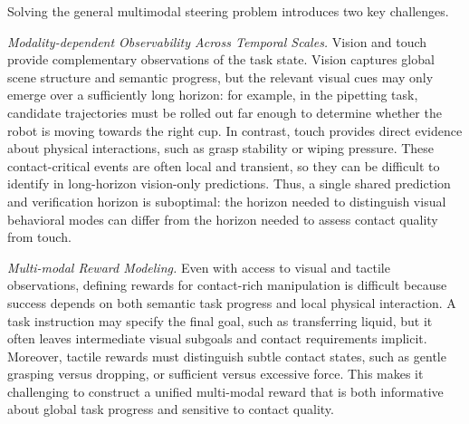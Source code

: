 \label{sec:open_challenges}Solving the general multimodal steering problem introduces two key challenges.



\textit{Modality-dependent Observability Across Temporal Scales.}
Vision and touch provide complementary observations of the task state. 
Vision captures global scene structure and semantic progress, but the relevant visual cues may only emerge over a sufficiently long horizon: for example, in the pipetting task, candidate trajectories must be rolled out far enough to determine whether the robot is moving towards the right cup. 
In contrast, touch provides direct evidence about physical interactions, such as grasp stability or wiping pressure. These contact-critical events are often local and transient, so they can be difficult to identify in long-horizon vision-only predictions. 
Thus, a single shared prediction and verification horizon is suboptimal: the horizon needed to distinguish visual behavioral modes can differ from the horizon needed to assess contact quality from touch.

\textit{Multi-modal Reward Modeling.}
Even with access to visual and tactile observations, defining rewards for contact-rich manipulation is difficult because success depends on both semantic task progress and local physical interaction. A task instruction may specify the final goal, such as transferring liquid, but it often leaves intermediate visual subgoals and contact requirements implicit. Moreover, tactile rewards must distinguish subtle contact states, such as gentle grasping versus dropping, or sufficient versus excessive force. This makes it challenging to construct a unified multi-modal reward that is both informative about global task progress and sensitive to contact quality.















